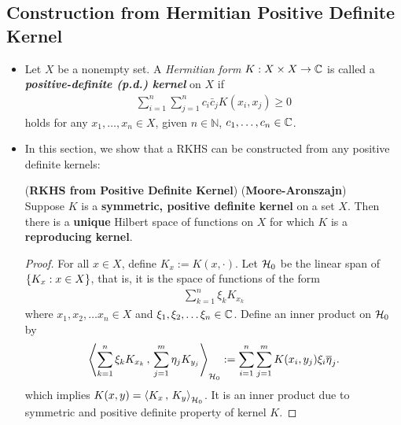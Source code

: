 \documentclass[11pt]{article}
\begin{document}
\subsection{Construction from Hermitian Positive Definite Kernel}
\begin{itemize}
\item \begin{definition}
Let $X$ be a nonempty set. A \emph{Hermitian form} $K: X\times X \to {\mathbb C}$ is called a \emph{\textbf{positive-definite (p.d.) kernel}} on $X$ if
\begin{align*}
 \sum _{i=1}^{n}\sum _{j=1}^{n}c_{i}\bar{c}_{j}K(x_{i},x_{j})\ge 0
\end{align*}
holds for any $x_{1},\ldots ,x_{n} \in X$, given $n\in \mathbb {N}$, $c_{1},\ldots ,c_{n}\in {\mathbb C}$.
\end{definition}


\item In this section, we show that a RKHS can be constructed from any positive definite kernels:
\begin{theorem}  (\textbf{RKHS from Positive Definite Kernel})  (\textbf{Moore-Aronszajn})\\
Suppose $K$ is a \textbf{symmetric, positive definite kernel} on a set $X$. Then there is a \textbf{unique} Hilbert space of functions on $X$ for which $K$ is a \textbf{reproducing kernel}.
\end{theorem}
\begin{proof}
For all $x \in X$, define $K_x := K(x, \cdot)$. Let ${\mathcal H}_0$ be the linear span of $\left\{K_x : x \in X\right\}$, that is, it is the space of functions of the form
\begin{align*}
\sum_{k=1}^{n}\xi_{k}K_{x_{k}}
\end{align*} where $x_1, x_2, \ldots x_n \in X$ and $\xi_1, \xi_2, \ldots \xi_n \in {\mathbb C}$. Define an inner product on ${\mathcal H}_0$ by
\begin{align*}
\left\langle \sum_{k=1}^{n}\xi_{k}K_{x_{k}}\,,\, \sum_{j=1}^{m}\eta_{j}K_{y_{j}} \right\rangle_{{\mathcal H}_0} := \sum_{i=1}^{n}\sum_{j=1}^{m}K(x_{i}, y_{j})\xi_{i}\overline{\eta}_{j}.
\end{align*} which implies $K(x, y) = \left\langle K_{x}\,,\, K_{y} \right\rangle_{{\mathcal H}_0}$. It is an inner product due to symmetric and positive definite property of kernel $K$.


\end{proof}
\end{itemize}
\end{document}

